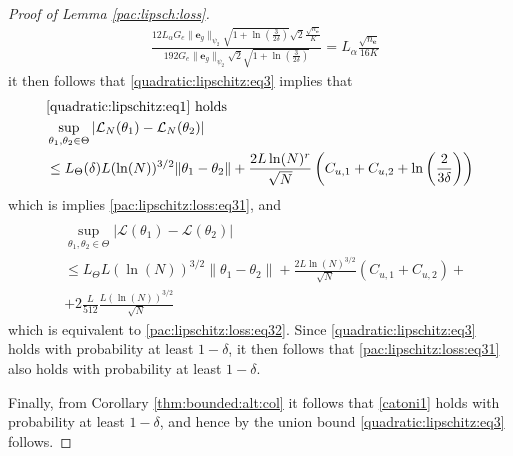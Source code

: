 \documentclass{article}
\newcommand{\e}{\mathbf{e}}
\newcommand{\y}{\mathbf{y}}
\begin{document}
\begin{proof}[Proof of Lemma \ref{pac:lipsch:loss}]
\begin{align*}
       & \frac{12 L_{\alpha}G_{e} \|\e_g\|_{\psi_2} \sqrt{1+\ln\left(\frac{3}{2\delta}\right)}\sqrt{2}\frac{\sqrt{n_\e}}{K}}{192 G_e \|\e_g\|_{\psi_2}\sqrt{2}\sqrt{1+\ln\left(\frac{3}{2\delta}\right)}}=
        L_{\alpha}\frac{\sqrt{n_\e}}{16K}
   \end{align*}
   it then follows that
   \eqref{quadratic:lipschitz:eq3} implies that 
   \begin{align}
   & \mbox{\eqref{quadratic:lipschitz:eq1} holds} \\
   & \sup_{\theta_1,\theta_2 \in \Theta} |\mathcal{L}_N(\theta_1) - \mathcal{L}_N(\theta_2)| \\
   & \le L_{\Theta}(\delta) L(\ln(N))^{3/2} \|\theta_1 - \theta_2\|
           +  \frac{2L\ln(N)^{r}}{\sqrt{N}}\left(C_{u,1} + C_{u,2}+\ln\left (\frac{2}{3\delta}\right)\right)
  \label{quadratic:lipschitz:eq41}
   \end{align}
   which is implies \eqref{pac:lipschitz:loss:eq31}, and 
   \begin{align}
           \\
       & \sup_{\theta_1,\theta_2 \in \Theta}
          |\mathcal{L}(\theta_1) - \mathcal{L}(\theta_2)| \\
          &  \le L_{\Theta} L(\ln(N))^{3/2} \|\theta_1 - \theta_2\|
          + \frac{2L\ln(N)^{3/2}}{\sqrt{N}}\left(C_{u,1} + C_{u,2}\right) + \\
          & +  2\frac{L}{512} \frac{L (\ln(N))^{3/2}}{\sqrt{N}}
  \label{quadratic:lipschitz:eq42}
   \end{align}
  which is equivalent to
  \eqref{pac:lipschitz:loss:eq32}. 
   Since \eqref{quadratic:lipschitz:eq3} holds with probability at least $1-\delta$, it then follows that
   \eqref{pac:lipschitz:loss:eq31} also holds with probability at least $1-\delta$.

   Finally, from Corollary \ref{thm:bounded:alt:col} it follows that \eqref{catoni1} holds with probability at least $1-\delta$, and hence by the union bound \eqref{quadratic:lipschitz:eq3} follows.
   
   
   

\end{proof}
\end{document}
